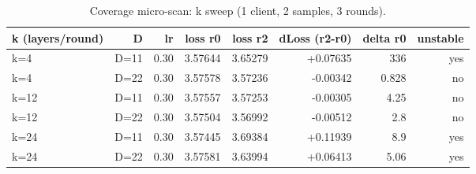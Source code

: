 \begin{table}[t]
\centering
\caption{Coverage micro-scan: k sweep (1 client, 2 samples, 3 rounds).}
\label{tab:opt-micro}
\begin{tabular}{lrrrrrrr}
\toprule
k (layers/round) & D & lr & loss r0 & loss r2 & dLoss (r2-r0) & delta r0 & unstable \\
\midrule
k=4 & D=11 & 0.30 & 3.57644 & 3.65279 & +0.07635 & 336 & yes \\
k=4 & D=22 & 0.30 & 3.57578 & 3.57236 & -0.00342 & 0.828 & no \\
k=12 & D=11 & 0.30 & 3.57557 & 3.57253 & -0.00305 & 4.25 & no \\
k=12 & D=22 & 0.30 & 3.57504 & 3.56992 & -0.00512 & 2.8 & no \\
k=24 & D=11 & 0.30 & 3.57445 & 3.69384 & +0.11939 & 8.9 & yes \\
k=24 & D=22 & 0.30 & 3.57581 & 3.63994 & +0.06413 & 5.06 & yes \\
\bottomrule
\end{tabular}
\end{table}
